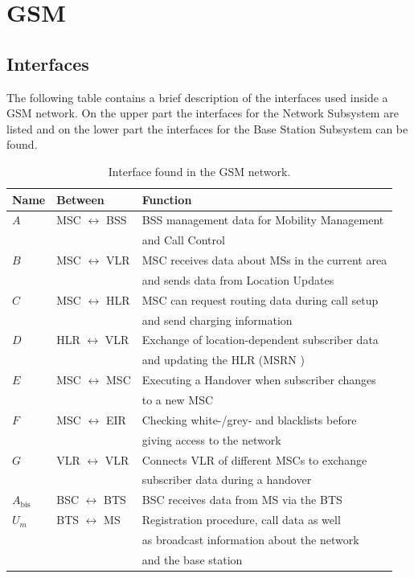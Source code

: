 \chapter{GSM}
\section{Interfaces}
\label{sec:interfaces}
The following table contains a brief description of the interfaces used inside a GSM network.
On the upper part the interfaces for the Network Subsystem are listed and on the lower part the interfaces for the Base Station Subsystem can be found.

\begin{table}[h!]
\centering
\begin{tabular}{lll}
\toprule
Name			&Between					&Function\\
\midrule
$A$				&MSC $\leftrightarrow$ BSS	&BSS management data for Mobility Management\\
				&							&and Call Control\\
$B$				&MSC $\leftrightarrow$ VLR	&MSC receives data about MSs in the current area\\
				&							& and sends data from Location Updates\\
$C$				&MSC $\leftrightarrow$ HLR	&MSC can request routing data during call setup\\
				&							&and send \eg charging information\\
$D$				&HLR $\leftrightarrow$ VLR	&Exchange of location-dependent subscriber data\\
				&							&and updating the HLR (MSRN \etc)\\
$E$				&MSC $\leftrightarrow$ MSC	&Executing a Handover when subscriber changes\\
				&							&to a new MSC\\
$F$				&MSC $\leftrightarrow$ EIR	&Checking white-/grey- and blacklists before\\
				&							&giving access to the network\\
$G$				&VLR $\leftrightarrow$ VLR	&Connects VLR of different MSCs to exchange\\
				&							&subscriber data during a handover\\
\midrule
$A_\text{bis}$	&BSC $\leftrightarrow$ BTS	&BSC receives data from MS via the BTS\\
$U_m$			&BTS $\leftrightarrow$ MS	&Registration procedure, call data \etc as well\\
				&							&as broadcast information about the network\\
				&							&and the base station\\
\bottomrule
\end{tabular}
\caption{Interface found in the GSM network.}
\end{table}

